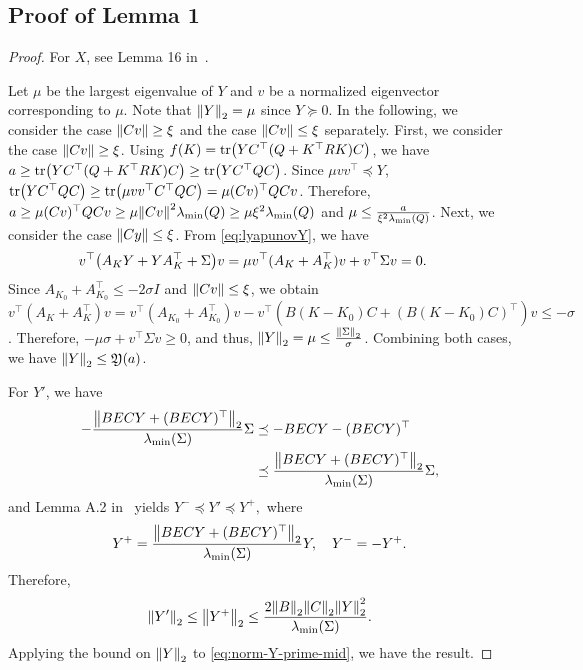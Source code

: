 \subsection{Proof of Lemma 1}\label{sec:proof-lemma1}
\begin{proof}
  For $X$, see Lemma 16 in~\cite{mohammadi2021convergence}.

  Let $\mu$ be the largest eigenvalue of $Y$ and
  $v$ be a normalized eigenvector corresponding to $\mu$.
  Note that $\norm{Y}_2 = \mu$ since $Y\succeq 0$.
  In the following, we consider the case $\norm{C v}\geq \xi$ and the case $\norm{C v}\leq \xi$ separately.
  First, we consider the case $\norm{Cv}\geq \xi$.
  Using $f(K) = \tr(YC^\top(Q+K^\top RK)C)$, we have
    $a  \geq \tr(YC^\top(Q+K^\top RK)C)  \geq \tr(YC^\top Q C)$.
  Since $\mu vv^\top \preceq Y$,
    $\tr(YC^\top Q C)  \geq \tr(\mu vv^\top C^\top Q C) = \mu(Cv)^\top Q Cv$.
  Therefore,
    $a  \geq \mu(Cv)^\top Q Cv
       \geq \mu\norm{Cv}^2 \lambda_{\min}(Q) 
       \geq \mu\xi^2 \lambda_{\min}(Q)$ and
    $\mu \leq \frac{a}{\xi^2\lambda_{\min}(Q)}$.
  Next, we consider the case $\norm{Cy}\leq \xi$.
  From \eqref{eq:lyapunovY}, we have
  \begin{align}
    v^\top \qty(A_K Y + Y A_K^\top + \Sigma) v & = \mu v^\top (A_K+A_K^\top)v+v^\top \Sigma v = 0.
  \end{align}
  Since $A_{K_0}+A_{K_0}^\top \leq -2\sigma I$ and $\norm{Cv}\leq \xi$, we obtain
    $v^\top (A_K+A_K^\top)v = v^\top (A_{K_0}+A_{K_0}^\top)v - v^\top (B(K-K_0)C+(B(K-K_0)C)^\top)v \leq  -\sigma$.
  Therefore,
    $-\mu\sigma+v^\top \Sigma v  \geq 0$,
  and thus,
    $\norm{Y}_2 = \mu \leq \frac{\norm{\Sigma}_2}{\sigma}$.
  Combining both cases, we have $\norm{Y}_2 \leq \mathfrak{Y}(a)$.

  For $Y'$, we have
  \begin{align}
       -\frac{\norm{BECY+(BECY)^\top}_2}{\lambda_{\min}(\Sigma)}\Sigma
       & \preceq -BECY-(BECY)^\top \\
       & \preceq \frac{\norm{BECY+(BECY)^\top}_2}{\lambda_{\min}(\Sigma)}\Sigma,
  \end{align}
  and Lemma A.2 in~\cite{fatkhullin2021optimizing} yields
  $
    Y^- \preceq Y' \preceq Y^+,
  $
  where 
  \begin{align}
      Y^+ = \frac{\norm{BECY+(BECY)^\top}_2}{\lambda_{\min}(\Sigma)}Y,\quad Y^- =-Y^+.
  \end{align}
  Therefore,
  \begin{align}
    \norm{Y'}_2  \leq \norm{Y^+}_2 
                 \leq \frac{2\norm{B}_2\norm{C}_2\norm{Y}_2^2}{\lambda_{\min}(\Sigma)}.\label{eq:norm-Y-prime-mid}
  \end{align}
  Applying the bound on $\norm{Y}_2$ to \eqref{eq:norm-Y-prime-mid}, we have the result.
\end{proof}
